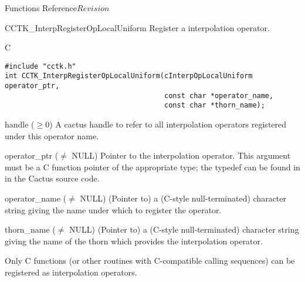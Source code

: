\begin{cactuspart}{ Functions Reference}{}{$Revision$}


\begin{FunctionDescription}{CCTK\_InterpRegisterOpLocalUniform}
\label{CCTK-InterpRegisterOpLocalUniform}
Register a  interpolation operator.

\begin{SynopsisSection}
\begin{Synopsis}{C}
\begin{verbatim}
#include "cctk.h"
int CCTK_InterpRegisterOpLocalUniform(cInterpOpLocalUniform operator_ptr,
                                      const char *operator_name,
                                      const char *thorn_name);
\end{verbatim}
\end{Synopsis}
\end{SynopsisSection}

\begin{ResultSection}
\begin{Result}{handle ($\ge 0$)}
A cactus handle to refer to all interpolation operators registered
under this operator name.
\end{Result}
\end{ResultSection}

\begin{ParameterSection}
\begin{Parameter}{operator\_ptr ($\ne$ NULL)}
\hbox{}
Pointer to the  interpolation operator.
This argument must be a C function pointer of the appropriate type;
the typedef can be found in  in the
Cactus source code.
\end{Parameter}
\begin{Parameter}{operator\_name ($\ne$ NULL)}
\hbox{}
(Pointer to) a (C-style null-terminated) character string giving
the name under which to register the operator.
\end{Parameter}
\begin{Parameter}{thorn\_name ($\ne$ NULL)}
\hbox{}
(Pointer to) a (C-style null-terminated) character string giving
the name of the thorn which provides the interpolation operator.
\end{Parameter}
\end{ParameterSection}

\begin{Discussion}
Only C functions (or other routines with C-compatible calling sequences)
can be registered as interpolation operators.
\end{Discussion}


\end{FunctionDescription}
\end{cactuspart}
